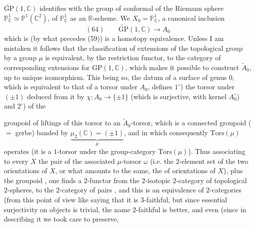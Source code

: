 $\widetilde{\mathrm{GP}}(1,\mathbb C)$ identifies with the group of conformal 
of the Riemann sphere  $\mathbb P^1_{\mathbb C}\simeq\mathbb P^1(\mathbb C^2)$,
  of $\mathbb P^1_{\mathbb C}$ as an $\mathbb R$-scheme.
We  $X_0=\mathbb P^1_{\mathbb C}$, 
a canonical inclusion
\[
(64)\qquad \widetilde{\mathrm{GP}}(1,\mathbb C)\longrightarrow A_0
\]
which is (by what precedes (59)) is a
homotopy equivalence. Unless I am mistaken
it follows  that the classification of
extensions of the topological group  by a group
 $\mu$ is equivalent, by the restriction
functor, to the category of corresponding
extensions for  $\mathrm{GP}(1,\mathbb C)$, which
makes it possible to construct $\widetilde A_0$, up to unique
isomorphism. This being so, the datum of
a surface  of genus $0$, which is equivalent
to that of a torsor \unsure{$[\mathrm{Isom}(\mathbb P^1_{\mathbb C},X))$|$(\mathrm{Isom}(\mathbb P^1_{\mathbb C},X))$}
under $A_0$, defines $1^\circ$) the torsor under
$(\pm1)$ deduced from it by $\chi:A_0\longrightarrow\{\pm1\}$
(which is surjective, with kernel $A_0^\circ$) and \unsure{$\varphi$} $2^\circ$) of the

groupoid of liftings of this 
torsor to an $\widetilde A_0$-torsor, which is
a connected groupoid ($=$ gerbe) banded by 
$\underbrace{\mu_2(\mathbb C)=(\pm1)}_{\mu}$,
and in which consequently $\mathrm{Tors}(\mu)$  operates
(it is a $1$-torsor under the group-category
$\mathrm{Tors}(\mu)$). Thus associating to every $X$
the pair  of the associated $\mu$-torsor $\omega$
(i.e. the $2$-element set of the two orientations of
$X$, or what amounts to the same, the 
of orientations of $X$), plus the \inserted{$\mu$-}groupoid
, one finds a $2$-functor from the
$2$-isotopic $2$-category of topological $2$-spheres,
to the $2$-category of pairs ,
and this is an equivalence of
$2$-categories (from this point of view 
like saying that it is $3$-faithful,
but since  essential surjectivity
on objects is trivial, the name
$2$-faithful is better, and even (since in
describing it we took care to preserve,


